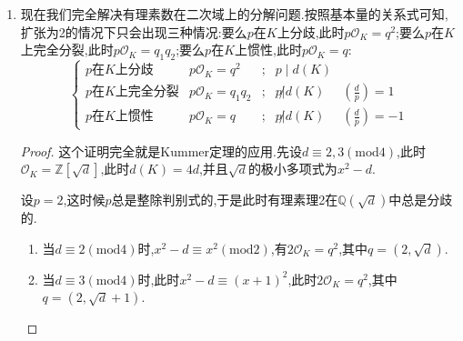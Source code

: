 \begin{enumerate}
\begin{proof}
    	设$\zeta$是一个$l$次本原根,考虑数环$\mathbb{Z}[\zeta]$.定义高斯和$\tau=\sum_{a\in(\mathbb{Z}/l\mathbb{Z})^*}\left(\frac{a}{l}\right)\zeta^a$.我们先来证明$\tau^2=\left(\frac{-1}{l}\right)l$.
    	
    	任取$a,b\in(\mathbb{Z}/l\mathbb{Z})^*$,记$c=ab^{-1}$,那么有:
    	\begin{align*}
    	\left(\frac{-1}{l}\right)\tau^2&=\sum_{a,b}\left(\frac{-ab}{l}\right)\zeta^{a+b}=\sum_{a,b}\left(\frac{ab^{-1}}{l}\right)\zeta^{a-b}=\sum_{b,c}\left(\frac{c}{l}\right)\zeta^{bc-b}\\&=\sum_{c\not=1}\left(\frac{c}{l}\right)\sum_b\zeta^{b(c-1)}+\sum_b\left(\frac{1}{l}\right)\\&=-\sum_{c\not=1}\left(\frac{c}{l}\right)+l-1=l
    	\end{align*}
    	
    	接下来一方面有:
    	$$\tau^p=\tau(\tau^2)^{\frac{p-1}{2}}\equiv\tau(-1)^{\frac{l-1}{2}\cdot\frac{p-1}{2}}\left(\frac{l}{p}\right),(\mathrm{mod}p)$$
    	
    	另一方面有:
    	$$\tau^p\equiv\sum_a\left(\frac{a}{l}\right)\zeta^{ap}\equiv\left(\frac{p}{l}\right)\sum_a\left(\frac{ap}{l}\right)\zeta^{ap}\equiv\left(\frac{p}{l}\right)\tau,(\mathrm{mod}p)$$
    	
    	这两个等式得到原命题.
    \end{proof}
    \item 现在我们完全解决有理素数在二次域上的分解问题.按照基本量的关系式可知,扩张为2的情况下只会出现三种情况:要么$p$在$K$上分歧,此时$p\mathscr{O}_K=q^2$;要么$p$在$K$上完全分裂,此时$p\mathscr{O}_K=q_1q_2$;要么$p$在$K$上惯性,此时$p\mathscr{O}_K=q$:
    $$\left\{\begin{array}{ccccc}p\text{在}K\text{上分歧}&p\mathscr{O}_K=q^2&;&p\mid d(K)&\\p\text{在}K\text{上完全分裂}&p\mathscr{O}_K=q_1q_2&;&p\not| d(K)&\left(\frac{d}{p}\right)=1\\p\text{在}K\text{上惯性}&p\mathscr{O}_K=q&;&p\not| d(K)&\left(\frac{d}{p}\right)=-1\end{array}\right.$$
    \begin{proof}
    	
    	这个证明完全就是Kummer定理的应用.先设$d\equiv2,3(\mathrm{mod}4)$,此时$\mathscr{O}_K=\mathbb{Z}[\sqrt{d}]$,此时$d(K)=4d$,并且$\sqrt{d}$的极小多项式为$x^2-d$.
    	
    	设$p=2$,这时候$p$总是整除判别式的,于是此时有理素理2在$\mathbb{Q}(\sqrt{d})$中总是分歧的.
    	\begin{enumerate}
    		\item 当$d\equiv2(\mathrm{mod}4)$时,$x^2-d\equiv x^2(\mathrm{mod}2)$,有$2\mathscr{O}_K=q^2$,其中$q=(2,\sqrt{d})$.
    		\item 当$d\equiv3(\mathrm{mod}4)$时,此时$x^2-d\equiv(x+1)^2$,此时$2\mathscr{O}_K=q^2$,其中$q=(2,\sqrt{d}+1)$.
    	\end{enumerate}
    	

\end{proof}
\end{enumerate}
